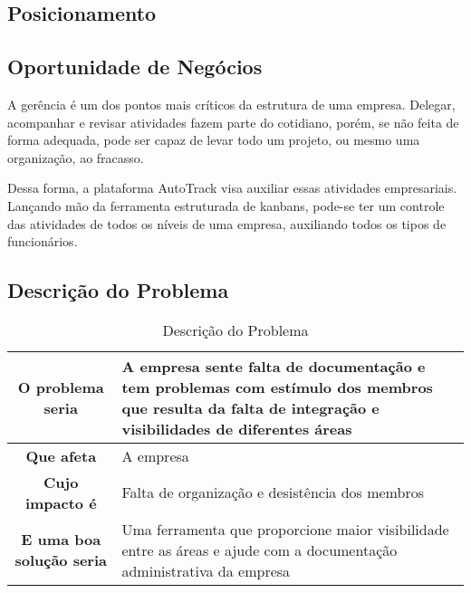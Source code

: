 \begin{apendicesenv}
\section{Posicionamento}
\subsection{Oportunidade de Negócios}
A gerência é um dos pontos mais críticos da estrutura de uma empresa. Delegar, acompanhar e revisar atividades fazem parte do cotidiano, porém, se não feita de forma adequada, pode ser capaz de levar todo um projeto, ou mesmo uma organização, ao fracasso.

Dessa forma, a plataforma AutoTrack visa auxiliar essas atividades empresariais. Lançando mão da ferramenta estruturada de kanbans, pode-se ter um controle das atividades de todos os níveis de uma empresa, auxiliando todos os tipos de funcionários.

\subsection{Descrição do Problema}

\begin{table}[!h]
  \centering
  \caption{Descrição do Problema}
  \begin{tabular}{|c|l|}
    \hline
    \textbf{O problema seria}        & \parbox[t]{9cm}{A empresa sente falta de documentação e tem problemas com estímulo dos membros que resulta da falta de integração e visibilidades de diferentes áreas} \\ \hline
    \textbf{Que afeta}               & A empresa                                                                                                                                             \\ \hline
    \textbf{Cujo impacto é}          & \parbox[t]{9cm}{Falta de organização e desistência dos membros}                                                                                                        \\ \hline
    \textbf{E uma boa solução seria} & \parbox[t]{9cm}{Uma ferramenta que proporcione maior visibilidade entre as áreas e ajude com a documentação administrativa da empresa}                                 \\ \hline
  \end{tabular}
\end{table}


\end{apendicesenv}
